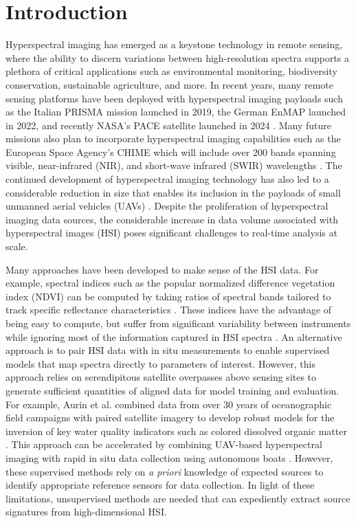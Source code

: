 \documentclass[remotesensing,article,submit,pdftex,moreauthors]{Definitions/mdpi}
\begin{document}

\section{Introduction}


Hyperspectral imaging has emerged as a keystone technology in remote sensing, where the ability to discern variations between high-resolution spectra supports a plethora of critical applications such as environmental monitoring, biodiversity conservation, sustainable agriculture, and more. In recent years, many remote sensing platforms have been deployed with hyperspectral imaging payloads such as the Italian PRISMA mission launched in 2019, the German EnMAP launched in 2022, and recently NASA's PACE satellite launched in 2024 \cite{PRISMA-orig, EnMAP-orig, PACE-orig}. Many future missions also plan to incorporate hyperspectral imaging capabilities such as the European Space Agency's CHIME which will include over $200$ bands spanning visible, near-infrared (NIR), and short-wave infrared (SWIR) wavelengths \cite{CHIME-orig}. The continued development of hyperspectral imaging technology has also led to a considerable reduction in size that enables its inclusion in the payloads of small unmanned aerial vehicles (UAVs) \cite{adao2017hyperspectral, arroyo2019implementation}. Despite the proliferation of hyperspectral imaging data sources, the considerable increase in data volume associated with hyperspectral images (HSI) poses significant challenges to real-time analysis at scale.

Many approaches have been developed to make sense of the HSI data. For example, spectral indices such as the popular normalized difference vegetation index (NDVI) can be computed by taking ratios of spectral bands tailored to track specific reflectance characteristics \cite{thenkabail-indices,thenkabail2018hyperspectral}. These indices have the advantage of being easy to compute, but suffer from significant variability between instruments while ignoring most of the information captured in HSI spectra \cite{ndvi-variability}. An alternative approach is to pair HSI data with in situ measurements to enable supervised models that map spectra directly to parameters of interest. However, this approach relies on serendipitous satellite overpasses above sensing sites to generate sufficient quantities of aligned data for model training and evaluation. For example, Aurin et al. combined data from over 30 years of oceanographic field campaigns with paired satellite imagery to develop robust models for the inversion of key water quality indicators such as colored dissolved organic matter \cite{aurin2018remote}. This approach can be accelerated by combining UAV-based hyperspectral imaging with rapid in situ data collection using autonomous boats \cite{robot-team-1, robot-team-2}. However, these supervised methods rely on \textit{a priori} knowledge of expected sources to identify appropriate reference sensors for data collection. In light of these limitations, unsupervised methods are needed that can expediently extract source signatures from high-dimensional HSI.
\end{document}
